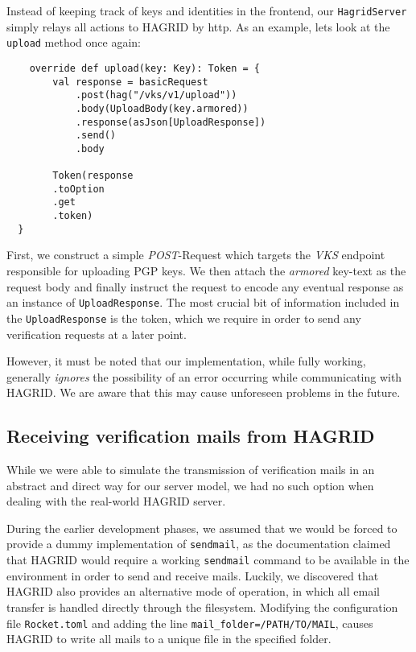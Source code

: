 Instead of keeping track of keys and identities in the frontend, our \texttt{HagridServer} simply relays all actions to HAGRID by http.
As an example, lets look at the \texttt{upload} method once again: 
\begin{verbatim}
    override def upload(key: Key): Token = {
        val response = basicRequest
            .post(hag("/vks/v1/upload"))
            .body(UploadBody(key.armored))
            .response(asJson[UploadResponse])
            .send()
            .body
 
        Token(response
        .toOption
        .get
        .token)
  }
\end{verbatim}
First, we construct a simple \emph{POST}-Request which targets the \emph{VKS} endpoint responsible for uploading PGP keys. We then attach the \emph{armored} key-text as the request body and finally instruct the request to encode any eventual response as an instance of \texttt{UploadResponse}.
The most crucial bit of information included in the \texttt{UploadResponse} is the token, which we require in order to send any verification requests at a later point.

However, it must be noted that our implementation, while fully working, generally \emph{ignores} the possibility of an error occurring while communicating with HAGRID. We are aware that this may cause unforeseen problems in the future.

\subsection{Receiving verification mails from HAGRID}
While we were able to simulate the transmission of verification mails in an abstract and direct way for our server model, we had no such option when dealing with the real-world HAGRID server. 

During the  earlier development phases, we assumed that we would be forced to provide a dummy implementation of \texttt{sendmail}, as the documentation claimed that HAGRID would require a working \texttt{sendmail} command to be available in the environment in order to send and receive mails.
Luckily, we discovered that HAGRID also provides an alternative mode of operation, in which all email transfer is handled directly through the filesystem.
Modifying the configuration file \texttt{Rocket.toml} and adding the line \texttt{mail_folder=/PATH/TO/MAIL}, causes HAGRID to write all mails to a unique file in the specified folder.

